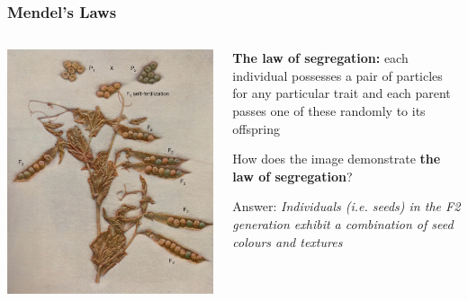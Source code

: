 \documentclass{beamer}
\begin{document}
\begin{frame}
	
	\frametitle{Mendel's Laws}
	\begin{columns}
	\begin{column}{0.6\textwidth}
		\includegraphics[keepaspectratio, width  =\textwidth]{img/crossedPeas}

\end{column}
\begin{column}{0.4\textwidth}
\small	
	\textbf{The law of segregation: } each individual possesses a pair of particles for any particular trait and each parent passes one of these randomly to its offspring
	\vspace{10pt}
		
	How does the image demonstrate \textbf{the law of segregation}?  \pause
	
	\vspace{10pt}
			
	Answer: \textit{Individuals (i.e. seeds) in the F2 generation exhibit a combination of seed colours and textures}
	
	
\end{column}		
		
	\end{columns}
\end{frame}
\end{document}
